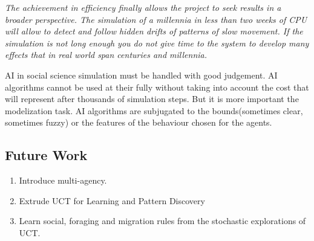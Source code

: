 \documentclass[11pt,oneside,a4paper,openright]{report}
\begin{document}
\textit{The achievement in efficiency finally allows the project to seek results in a broader perspective. The simulation of a millennia in less than two weeks of CPU will allow to detect and follow hidden drifts of patterns of slow movement. 
If the simulation is not long enough you do not give time to the system to develop many effects that in real world span centuries and millennia.}


AI in social science simulation must be handled with good judgement. AI algorithms cannot be used at their fully without taking into account the cost that will represent after thousands of simulation steps. But it is more important the modelization task. AI algorithms are subjugated to the bounds(sometimes clear, sometimes fuzzy) or the features of the behaviour chosen for the agents. 


\subsection{Future Work}

\begin{enumerate}

	\item Introduce multi-agency.
	
	\item Extrude UCT for Learning and Pattern Discovery	
	
	\item Learn social, foraging and migration rules from the stochastic explorations of UCT.
	
\end{enumerate}
\end{document}
